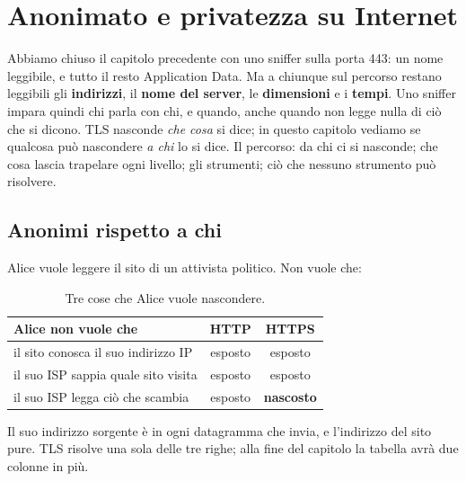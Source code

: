 \chapter{Anonimato e privatezza su Internet}

Abbiamo chiuso il capitolo precedente con uno sniffer sulla porta 443: un nome leggibile, e tutto il resto Application Data. Ma a
chiunque sul percorso restano leggibili gli \textbf{indirizzi}, il \textbf{nome del server}, le \textbf{dimensioni} e i \textbf{tempi}.
Uno sniffer impara quindi chi parla con chi, e quando, anche quando non legge nulla di ciò che si dicono. TLS nasconde \emph{che cosa}
si dice; in questo capitolo vediamo se qualcosa può nascondere \emph{a chi} lo si dice. Il percorso: da chi ci si nasconde; che cosa
lascia trapelare ogni livello; gli strumenti; ciò che nessuno strumento può risolvere.

\section{Anonimi rispetto a chi}

Alice vuole leggere il sito di un attivista politico. Non vuole che:

\begin{table}[H]
\centering
\begin{tabular}{lcc}
\toprule
\textbf{Alice non vuole che} & \textbf{HTTP} & \textbf{HTTPS} \\
\midrule
il sito conosca il suo indirizzo IP & esposto & esposto \\
il suo ISP sappia quale sito visita & esposto & esposto \\
il suo ISP legga ciò che scambia & esposto & \textbf{nascosto} \\
\bottomrule
\end{tabular}
\caption{Tre cose che Alice vuole nascondere.}
\end{table}

Il suo indirizzo sorgente è in ogni datagramma che invia, e l'indirizzo del sito pure. TLS risolve una sola delle tre righe; alla fine
del capitolo la tabella avrà due colonne in più.

